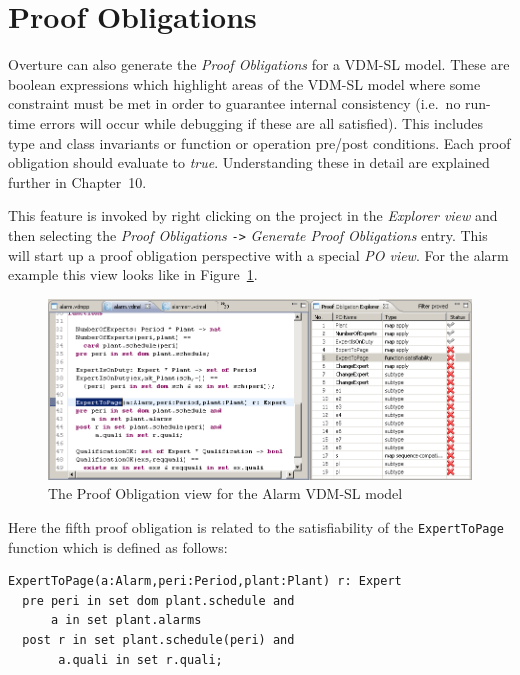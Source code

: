 \section{Proof Obligations}\label{sec:POtool}

Overture can also generate the \emph{Proof Obligations} for a VDM-SL
model. These are boolean expressions which highlight areas of the
VDM-SL model where some constraint must be met in order to guarantee
internal consistency (i.e.\ no run-time errors will occur while
debugging if these are all satisfied). This includes type and class
invariants or function or operation pre/post conditions. Each proof
obligation should evaluate to \emph{true}. Understanding these in
detail are explained further in Chapter~10.

This feature is invoked by right clicking on the project in the
\emph{Explorer view} and then selecting the \emph{Proof Obligations}
\texttt{->} \emph{Generate Proof Obligations} entry. This will start up a proof
obligation perspective with a special \emph{PO view}. For the alarm
example this view looks like in Figure~\ref{fig:POview}.
\begin{figure}[htbp]
\begin{center}
\includegraphics[width=5.5in]{figures/POview}
\caption{The Proof Obligation view for the Alarm VDM-SL model\label{fig:POview}}
\end{center}
\end{figure}
Here the fifth proof obligation is related to the satisfiability of
the \texttt{ExpertToPage} function which is defined as follows: 

\begin{lstlisting}
ExpertToPage(a:Alarm,peri:Period,plant:Plant) r: Expert
  pre peri in set dom plant.schedule and
      a in set plant.alarms
  post r in set plant.schedule(peri) and
       a.quali in set r.quali;
\end{lstlisting}


